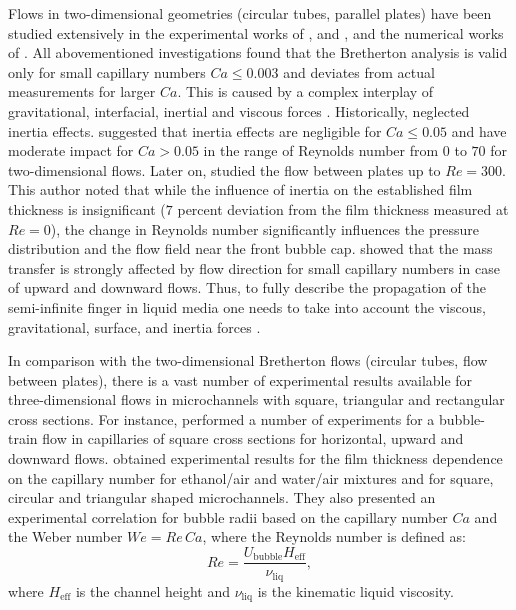 \documentclass[preprint,12pt]{elsarticle}
\begin{document}
Flows in two-dimensional geometries (circular tubes, parallel plates) have been studied extensively
in the 
experimental works of \citet{aussillous-deposition}, and \citet{cerro-bubble-train}, and the
numerical works of
\citet{giavedoni-numerical,heil-bretherton}. All abovementioned investigations found that the 
Bretherton
analysis is valid only for small capillary numbers $Ca\leq 0.003$ and deviates from actual
measurements for larger $Ca$.
This is caused by a complex interplay of gravitational,
interfacial, inertial and viscous forces \cite{gupta-review}. Historically, 
\citet{bretherton} neglected inertia effects. \citet{giavedoni-numerical} suggested
that
inertia effects
are negligible for $Ca \leq 0.05$ and have moderate impact for $Ca>0.05$ in the range of Reynolds
number from $0$ to $70$ for two-dimensional flows. Later on, \citet{heil-bretherton}
studied the flow between plates up to $Re=300$. This author noted that while the
influence of inertia on the established film thickness is
insignificant
($7$ percent deviation from the film thickness measured at $Re=0$), the change in Reynolds number
significantly influences  the pressure distribution and the flow field near the front bubble cap.
\citet{cerro-bubble-train} showed that the mass transfer is strongly affected by flow direction for
small capillary numbers in case of upward and downward flows. Thus, to fully describe the
propagation of the semi-infinite finger in liquid media one needs to take into account the
viscous, gravitational, surface, and inertia forces \cite{gupta-review}.  

In comparison with the two-dimensional Bretherton flows (circular tubes, flow between plates), there
is a vast number of experimental
results available for three-dimensional flows in microchannels with square, triangular and
rectangular cross sections. For instance, \citet{cerro-bubble-train} performed a number of
experiments for a
bubble-train flow in capillaries of square cross sections for horizontal, upward and downward flows.
\citet{shikazono-square} obtained
experimental
results for the film thickness dependence on the
capillary number for ethanol/air and water/air mixtures and for square, circular and triangular
shaped microchannels. They also presented an experimental correlation for  bubble
radii
based on the capillary number $Ca$ and the Weber number $We=Re\,Ca$, where the Reynolds number is
defined as:
\begin{equation}
Re=\frac{U_{\mathrm{bubble}} H_{\mathrm{eff}}}{\nu_{\mathrm{liq}}},
\end{equation}
where $H_{\mathrm{eff}}$ is the channel height and $\nu_{\mathrm{liq}}$ is the kinematic liquid
viscosity.
\end{document}
